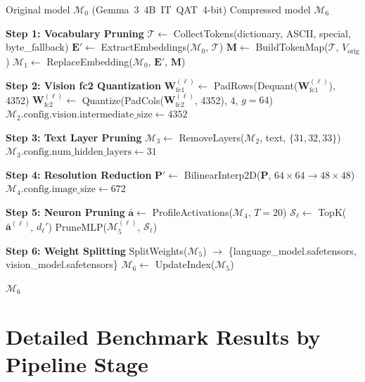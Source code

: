 \documentclass[11pt]{article}
\begin{document}
\begin{algorithm}[h]
\caption{Gemma-Prune Compression Pipeline}
\label{alg:pipeline}
\begin{algorithmic}[1]
\REQUIRE Original model $\mathcal{M}_0$ (Gemma~3~4B~IT~QAT~4-bit)
\ENSURE Compressed model $\mathcal{M}_6$

\STATE \textbf{Step 1: Vocabulary Pruning}
\STATE $\mathcal{T} \leftarrow$ CollectTokens(dictionary, ASCII, special, byte\_fallback)
\STATE $\mathbf{E}' \leftarrow$ ExtractEmbeddings($\mathcal{M}_0$, $\mathcal{T}$)
\STATE $\mathbf{M} \leftarrow$ BuildTokenMap($\mathcal{T}$, $V_{\text{orig}}$)
\STATE $\mathcal{M}_1 \leftarrow$ ReplaceEmbedding($\mathcal{M}_0$, $\mathbf{E}'$, $\mathbf{M}$)

\STATE \textbf{Step 2: Vision fc2 Quantization}
    \STATE $\mathbf{W}_{\text{fc1}}^{(\ell)} \leftarrow$ PadRows(Dequant($\mathbf{W}_{\text{fc1}}^{(\ell)}$), 4352)
    \STATE $\mathbf{W}_{\text{fc2}}^{(\ell)} \leftarrow$ Quantize(PadCols($\mathbf{W}_{\text{fc2}}^{(\ell)}$, 4352), 4, $g{=}64$)
\ENDFOR
\STATE $\mathcal{M}_2.\text{config.vision.intermediate\_size} \leftarrow 4352$

\STATE \textbf{Step 3: Text Layer Pruning}
\STATE $\mathcal{M}_3 \leftarrow$ RemoveLayers($\mathcal{M}_2$, text, $\{31, 32, 33\}$)
\STATE $\mathcal{M}_3.\text{config.num\_hidden\_layers} \leftarrow 31$

\STATE \textbf{Step 4: Resolution Reduction}
\STATE $\mathbf{P}' \leftarrow$ BilinearInterp2D($\mathbf{P}$, $64{\times}64 \rightarrow 48{\times}48$)
\STATE $\mathcal{M}_4.\text{config.image\_size} \leftarrow 672$

\STATE \textbf{Step 5: Neuron Pruning}
\STATE $\bar{\mathbf{a}} \leftarrow$ ProfileActivations($\mathcal{M}_4$, $T{=}20$)
    \STATE $\mathcal{S}_\ell \leftarrow$ TopK($\bar{\mathbf{a}}^{(\ell)}$, $d_\ell'$) 
    \STATE PruneMLP($\mathcal{M}_5^{(\ell)}$, $\mathcal{S}_\ell$)
\ENDFOR

\STATE \textbf{Step 6: Weight Splitting}
\STATE SplitWeights($\mathcal{M}_5$) $\rightarrow$ \{language\_model.safetensors, vision\_model.safetensors\}
\STATE $\mathcal{M}_6 \leftarrow$ UpdateIndex($\mathcal{M}_5$)

\RETURN $\mathcal{M}_6$
\end{algorithmic}
\end{algorithm}

\section{Detailed Benchmark Results by Pipeline Stage}
\label{app:benchmarks}
\end{document}

